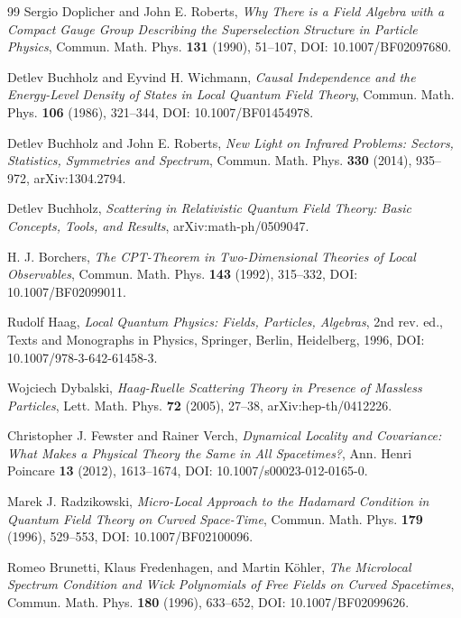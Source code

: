 \documentclass[11pt,a4paper]{article}
\begin{document}
\begin{thebibliography}{99}
Sergio Doplicher and John E. Roberts,
\emph{Why There is a Field Algebra with a Compact Gauge Group Describing the Superselection Structure in Particle Physics},
Commun. Math. Phys. \textbf{131} (1990), 51--107,
DOI: 10.1007/BF02097680.

Detlev Buchholz and Eyvind H. Wichmann,
\emph{Causal Independence and the Energy-Level Density of States in Local Quantum Field Theory},
Commun. Math. Phys. \textbf{106} (1986), 321--344,
DOI: 10.1007/BF01454978.

Detlev Buchholz and John E. Roberts,
\emph{New Light on Infrared Problems: Sectors, Statistics, Symmetries and Spectrum},
Commun. Math. Phys. \textbf{330} (2014), 935--972,
arXiv:1304.2794.

Detlev Buchholz,
\emph{Scattering in Relativistic Quantum Field Theory: Basic Concepts, Tools, and Results},
arXiv:math-ph/0509047.

H. J. Borchers,
\emph{The CPT-Theorem in Two-Dimensional Theories of Local Observables},
Commun. Math. Phys. \textbf{143} (1992), 315--332,
DOI: 10.1007/BF02099011.

Rudolf Haag,
\emph{Local Quantum Physics: Fields, Particles, Algebras},
2nd rev. ed., Texts and Monographs in Physics, Springer, Berlin, Heidelberg, 1996,
DOI: 10.1007/978-3-642-61458-3.

Wojciech Dybalski,
\emph{Haag-Ruelle Scattering Theory in Presence of Massless Particles},
Lett. Math. Phys. \textbf{72} (2005), 27--38,
arXiv:hep-th/0412226.

Christopher J. Fewster and Rainer Verch,
\emph{Dynamical Locality and Covariance: What Makes a Physical Theory the Same in All Spacetimes?},
Ann. Henri Poincare \textbf{13} (2012), 1613--1674,
DOI: 10.1007/s00023-012-0165-0.

Marek J. Radzikowski,
\emph{Micro-Local Approach to the Hadamard Condition in Quantum Field Theory on Curved Space-Time},
Commun. Math. Phys. \textbf{179} (1996), 529--553,
DOI: 10.1007/BF02100096.

Romeo Brunetti, Klaus Fredenhagen, and Martin Köhler,
\emph{The Microlocal Spectrum Condition and Wick Polynomials of Free Fields on Curved Spacetimes},
Commun. Math. Phys. \textbf{180} (1996), 633--652,
DOI: 10.1007/BF02099626.


\end{thebibliography}
\end{document}
